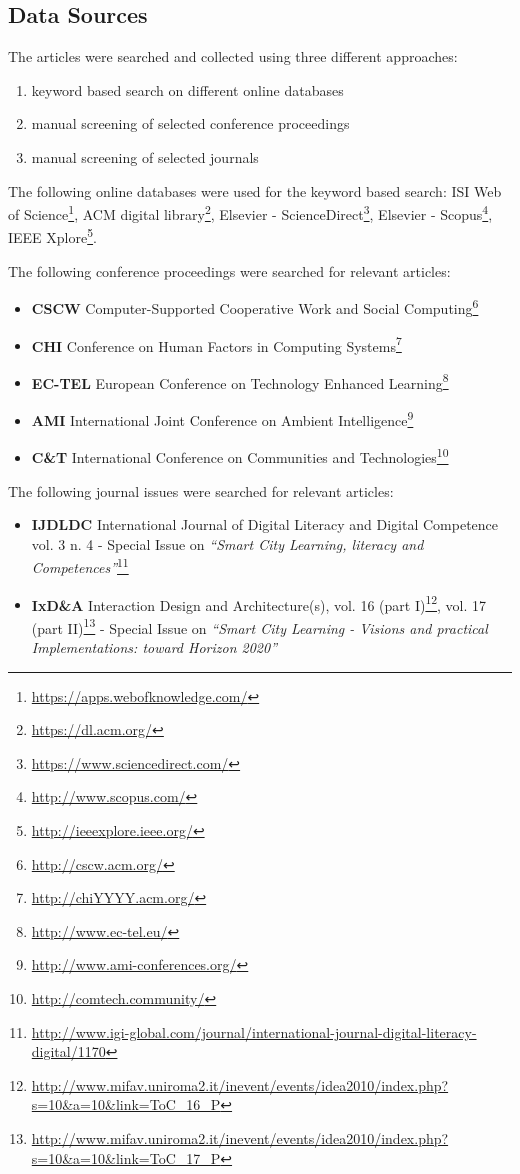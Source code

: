 \subsection{Data Sources}
The articles were searched and collected using three different approaches:

\begin{enumerate}
\item keyword based search on different online databases
\item manual screening of selected conference proceedings
\item manual screening of selected journals
\end{enumerate}

The following online databases were used for the keyword based search: ISI Web of Science\footnote{\url{https://apps.webofknowledge.com/}}, ACM digital library\footnote{\url{https://dl.acm.org/}}, Elsevier - ScienceDirect\footnote{\url{https://www.sciencedirect.com/}}, Elsevier - Scopus\footnote{\url{http://www.scopus.com/}}, IEEE Xplore\footnote{\url{http://ieeexplore.ieee.org/}}.

\medskip

The following conference proceedings were searched for relevant articles:
\begin{itemize}
\item \textbf{CSCW} Computer-Supported Cooperative Work and Social Computing\footnote{\url{http://cscw.acm.org/}}
\item \textbf{CHI} Conference on Human Factors in Computing Systems\footnote{\url{http://chiYYYY.acm.org/}}
\item \textbf{EC-TEL} European Conference on Technology Enhanced Learning\footnote{\url{http://www.ec-tel.eu/}}
\item \textbf{AMI} International Joint Conference on Ambient Intelligence\footnote{\url{http://www.ami-conferences.org/}}
\item \textbf{C\&T} International Conference on Communities and Technologies\footnote{\url{http://comtech.community/}}
\end{itemize}

The following journal issues were searched for relevant articles:
\begin{itemize}
\item \textbf{IJDLDC} International Journal of Digital Literacy and Digital Competence vol. 3 n. 4 - Special Issue on \textit{``Smart City Learning, literacy and Competences''}\footnote{\url{http://www.igi-global.com/journal/international-journal-digital-literacy-digital/1170}}
\item \textbf{IxD\&A} Interaction Design and Architecture(s), vol. 16 (part I)\footnote{\url{http://www.mifav.uniroma2.it/inevent/events/idea2010/index.php?s=10&a=10&link=ToC_16_P}}, vol. 17 (part II)\footnote{\url{http://www.mifav.uniroma2.it/inevent/events/idea2010/index.php?s=10&a=10&link=ToC_17_P}} - Special Issue on \textit{``Smart City Learning - Visions and practical Implementations: toward Horizon 2020''} 
\end{itemize}

